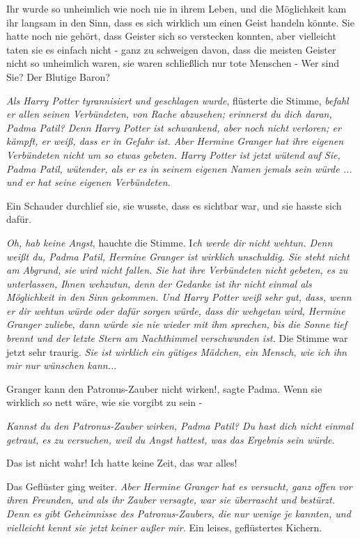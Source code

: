 Ihr wurde so unheimlich wie noch nie in ihrem Leben, und die Möglichkeit kam ihr
langsam in den Sinn, dass es sich wirklich um einen Geist handeln könnte. Sie
hatte noch nie gehört, dass Geister sich so verstecken konnten, aber vielleicht
taten sie es einfach nicht - ganz zu schweigen davon, dass die meisten Geister
nicht so unheimlich waren, sie waren schließlich nur tote Menschen - \glqq{}Wer
sind Sie? Der Blutige Baron?\grqq{}

\glqq{}\emph{Als Harry Potter tyrannisiert und geschlagen wurde}\grqq{},
flüsterte die Stimme, \glqq{}\emph{befahl er allen seinen Verbündeten, von Rache
abzusehen; erinnerst du dich daran, Padma Patil? Denn Harry Potter ist
schwankend, aber noch nicht verloren; er kämpft, er weiß, dass er in Gefahr ist.
Aber Hermine Granger hat ihre eigenen Verbündeten nicht um so etwas gebeten.
Harry Potter ist jetzt wütend auf Sie, Padma Patil, wütender, als er es in
seinem eigenen Namen jemals sein würde ... und er hat seine eigenen
Verbündeten.}\grqq{}

Ein Schauder durchlief sie, sie wusste, dass es sichtbar war, und sie hasste
sich dafür.

\glqq{}\emph{Oh, hab keine Angst}\grqq{}, hauchte die Stimme. \glqq{}I\emph{ch
werde dir nicht wehtun. Denn weißt du, Padma Patil, Hermine Granger ist wirklich
unschuldig. Sie steht nicht am Abgrund, sie wird nicht fallen. Sie hat ihre
Verbündeten nicht gebeten, es zu unterlassen, Ihnen wehzutun, denn der Gedanke
ist ihr nicht einmal als Möglichkeit in den Sinn gekommen. Und Harry Potter weiß
sehr gut, dass, wenn er dir wehtun würde oder dafür sorgen würde, dass dir
wehgetan wird, Hermine Granger zuliebe, dann würde sie nie wieder mit ihm
sprechen, bis die Sonne tief brennt und der letzte Stern am Nachthimmel
verschwunden ist.}\grqq{} Die Stimme war jetzt sehr traurig. \glqq{}\emph{Sie ist
wirklich ein gütiges Mädchen, ein Mensch, wie ich ihn mir nur wünschen kann..}.\grqq{}

\glqq{}Granger kann den Patronus-Zauber nicht wirken!\grqq{}, sagte Padma. \glqq{}
Wenn sie wirklich so nett wäre, wie sie vorgibt zu sein -\grqq{}

\glqq{}\emph{Kannst du den Patronus-Zauber wirken, Padma Patil? Du hast dich
nicht einmal getraut, es zu versuchen, weil du Angst hattest, was das Ergebnis
sein würde}.\grqq{}

\glqq{}Das ist nicht wahr! Ich hatte keine Zeit, das war alles!\grqq{}

Das Geflüster ging weiter. \glqq{}\emph{Aber Hermine Granger hat es versucht,
ganz offen vor ihren Freunden, und als ihr Zauber versagte, war sie überrascht
und bestürzt. Denn es gibt Geheimnisse des Patronus-Zaubers, die nur wenige je
kannten, und vielleicht kennt sie jetzt keiner außer mir.}\grqq{} Ein leises,
geflüstertes Kichern.


